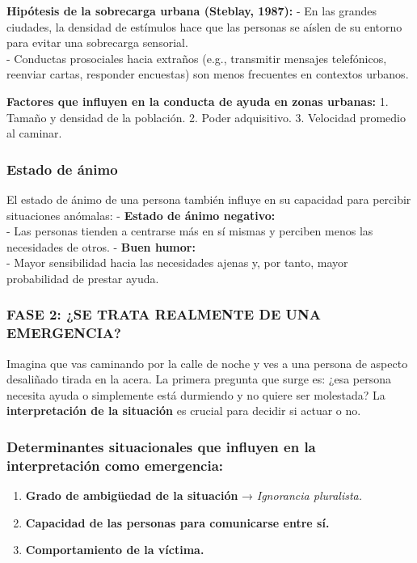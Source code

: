 \documentclass[
]{book}
\providecommand{\tightlist}{%
  \setlength{\itemsep}{0pt}\setlength{\parskip}{0pt}}
\begin{document}
\textbf{Hipótesis de la sobrecarga urbana (Steblay, 1987):}
- En las grandes ciudades, la densidad de estímulos hace que las personas se aíslen de su entorno para evitar una sobrecarga sensorial.\\
- Conductas prosociales hacia extraños (e.g., transmitir mensajes telefónicos, reenviar cartas, responder encuestas) son menos frecuentes en contextos urbanos.

\textbf{Factores que influyen en la conducta de ayuda en zonas urbanas:}
1. Tamaño y densidad de la población.
2. Poder adquisitivo.
3. Velocidad promedio al caminar.

\subsubsection{Estado de ánimo}\label{estado-de-uxe1nimo}

El estado de ánimo de una persona también influye en su capacidad para percibir situaciones anómalas:
- \textbf{Estado de ánimo negativo:}\\
- Las personas tienden a centrarse más en sí mismas y perciben menos las necesidades de otros.
- \textbf{Buen humor:}\\
- Mayor sensibilidad hacia las necesidades ajenas y, por tanto, mayor probabilidad de prestar ayuda.

\subsubsection{FASE 2: ¿SE TRATA REALMENTE DE UNA EMERGENCIA?}\label{fase-2-se-trata-realmente-de-una-emergencia}

Imagina que vas caminando por la calle de noche y ves a una persona de aspecto desaliñado tirada en la acera. La primera pregunta que surge es: ¿esa persona necesita ayuda o simplemente está durmiendo y no quiere ser molestada? La \textbf{interpretación de la situación} es crucial para decidir si actuar o no.

\subsubsection{Determinantes situacionales que influyen en la interpretación como emergencia:}\label{determinantes-situacionales-que-influyen-en-la-interpretaciuxf3n-como-emergencia}

\begin{enumerate}
\def\labelenumi{\arabic{enumi}.}
\tightlist
\item
  \textbf{Grado de ambigüedad de la situación} → \emph{Ignorancia pluralista.}
\item
  \textbf{Capacidad de las personas para comunicarse entre sí.}
\item
  \textbf{Comportamiento de la víctima.}
\end{enumerate}
\end{document}
